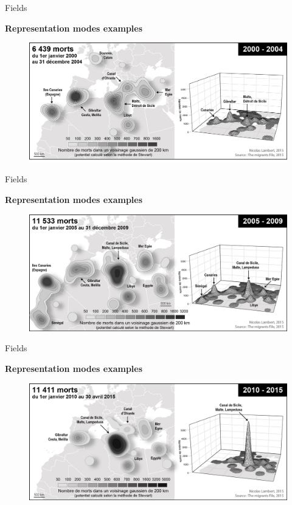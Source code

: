 \begin{frame}{Fields}

\textbf{Representation modes examples}

\begin{figure}
\includegraphics[width=11.5cm]{Migrants2.png}
\end{figure}

\end{frame}


\begin{frame}{Fields}

\textbf{Representation modes examples}

\begin{figure}
\includegraphics[width=11.5cm]{Migrants3.png}
\end{figure}

\end{frame}


\begin{frame}{Fields}

\textbf{Representation modes examples}

\begin{figure}
\includegraphics[width=11.5cm]{Migrants4.png}
\end{figure}

\end{frame}


